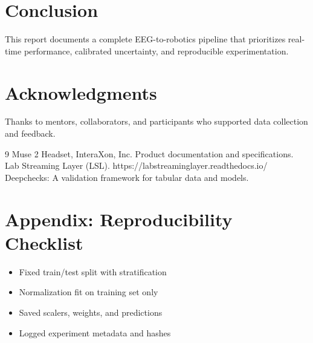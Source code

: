 \documentclass[11pt]{article}
\begin{document}
\section{Conclusion}
This report documents a complete EEG-to-robotics pipeline that prioritizes
real-time performance, calibrated uncertainty, and reproducible experimentation.

\section*{Acknowledgments}
Thanks to mentors, collaborators, and participants who supported data
collection and feedback.

\begin{thebibliography}{9}
Muse 2 Headset, InteraXon, Inc. Product documentation and specifications.
Lab Streaming Layer (LSL). https://labstreaminglayer.readthedocs.io/
Deepchecks: A validation framework for tabular data and models.
\end{thebibliography}

\appendix
\section{Appendix: Reproducibility Checklist}
\begin{itemize}
    \item Fixed train/test split with stratification
    \item Normalization fit on training set only
    \item Saved scalers, weights, and predictions
    \item Logged experiment metadata and hashes
\end{itemize}
\end{document}
